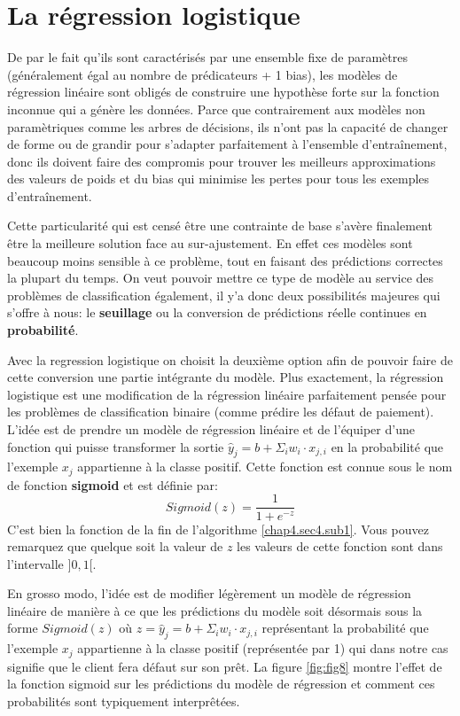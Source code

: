 \section{La régression logistique}
\label{chap4.section6}
De par le fait qu'ils sont caractérisés par une ensemble fixe de paramètres (généralement égal au nombre de prédicateurs + 1 bias), les modèles de régression linéaire sont obligés de construire une hypothèse forte sur la fonction inconnue qui a génère les données. Parce que contrairement aux modèles non paramètriques comme les arbres de décisions, ils n'ont pas la capacité de changer de forme ou de grandir pour s'adapter parfaitement à l'ensemble d'entraînement, donc ils doivent faire des compromis pour trouver les meilleurs approximations des valeurs de poids et du bias qui minimise les pertes pour tous les exemples d'entraînement.

Cette particularité qui est censé être une contrainte de base s'avère finalement être la meilleure solution face au sur-ajustement. En effet ces modèles sont beaucoup moins sensible à ce problème, tout en faisant des prédictions correctes la plupart du temps. On veut pouvoir mettre ce type de modèle au service des problèmes de classification également, il y'a donc deux possibilités majeures qui s'offre à nous: le \textbf{seuillage} ou la conversion de prédictions réelle continues en \textbf{probabilité}.

Avec la regression logistique on choisit la deuxième option afin de pouvoir faire de cette conversion une partie intégrante du modèle. Plus exactement, la régression logistique est une modification de la régression linéaire parfaitement pensée pour les problèmes de classification binaire (comme prédire les défaut de paiement). L'idée est de prendre un modèle de régression linéaire et de l'équiper d'une fonction qui puisse transformer la sortie \(\hat{y}_j = b + \Sigma_i w_i \cdot x_{j,i}\) en la probabilité que l'exemple \(x_j\) appartienne à la classe positif. Cette fonction est connue sous le nom de fonction \textbf{sigmoid} et est définie par: \[Sigmoid(z) = \frac{1}{1 + e^{-z}}\] C'est bien la fonction de la fin de l'algorithme \ref{chap4.sec4.sub1}. Vous pouvez remarquez que quelque soit la valeur de \(z\) les valeurs de cette fonction sont dans l'intervalle \(]0, 1[\).

En grosso modo, l'idée est de modifier légèrement un modèle de régression linéaire de manière à ce que les prédictions du modèle soit désormais sous la forme \(Sigmoid(z)\) où \(z = \hat{y}_j = b + \Sigma_i w_i \cdot x_{j,i}\) représentant la probabilité que l'exemple \(x_j\) appartienne à la classe positif (représentée par 1) qui dans notre cas signifie que le client fera défaut sur son prêt. La figure \ref{fig:fig8} montre l'effet de la fonction sigmoid sur les prédictions du modèle de régression et comment ces probabilités sont typiquement interprêtées.

